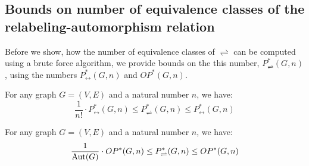 \begin{highlight}
\section{Bounds on number of equivalence classes of the relabeling-automorphism relation}

Before we show, how the number of equivalence classes of $\rightleftharpoons$ can be computed using a brute force algorithm, we provide bounds on the this number, $P^*_\rightleftharpoons(G,n)$, using the numbers $P^*_\leftrightarrow(G,n)$ and $OP^*(G,n)$.

\begin{claim}
    For any graph $G=(V,E)$ and a natural number $n$, we have: $$\frac{1}{n!} \cdot P^*_\leftrightarrow(G,n) \leq P^*_\rightleftharpoons(G,n) \leq P^*_\leftrightarrow(G,n)$$ 
\end{claim}

\begin{claim}
    For any graph $G=(V,E)$ and a natural number $n$, we have: $$\frac{1}{\operatorname{Aut}(G)} \cdot OP^*(G,n) \leq P^*_\rightleftharpoons(G,n) \leq OP^*(G,n)$$
\end{claim}


\end{highlight}